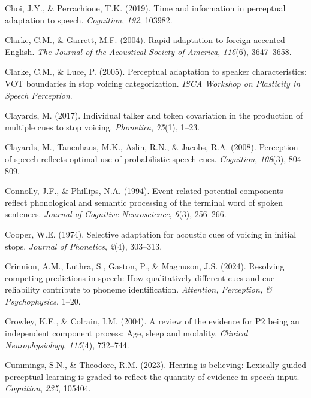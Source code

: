 \documentclass[
  12pt,
  twoside]{article}
\newlength{\cslhangindent}
\newlength{\cslentryspacingunit} %
\newenvironment{CSLReferences}[2] %
 {%
  \setlength{\parindent}{0pt}
  \ifodd #1
  \let\oldpar\par
  \def\par{\hangindent=\cslhangindent\oldpar}
  \fi
  \setlength{\parskip}{#2\cslentryspacingunit}
 }%
 {}
\begin{document}
\begin{CSLReferences}{1}{0}
\leavevmode{}%
Choi, J.Y., \& Perrachione, T.K. (2019). Time and information in perceptual adaptation to speech. \emph{Cognition}, \emph{192}, 103982.

\leavevmode{}%
Clarke, C.M., \& Garrett, M.F. (2004). Rapid adaptation to foreign-accented {English}. \emph{The Journal of the Acoustical Society of America}, \emph{116}(6), 3647--3658.

\leavevmode{}%
Clarke, C.M., \& Luce, P. (2005). Perceptual adaptation to speaker characteristics: {VOT} boundaries in stop voicing categorization. \emph{ISCA Workshop on Plasticity in Speech Perception}.

\leavevmode{}%
Clayards, M. (2017). Individual talker and token covariation in the production of multiple cues to stop voicing. \emph{Phonetica}, \emph{75}(1), 1--23.

\leavevmode{}%
Clayards, M., Tanenhaus, M.K., Aslin, R.N., \& Jacobs, R.A. (2008). Perception of speech reflects optimal use of probabilistic speech cues. \emph{Cognition}, \emph{108}(3), 804--809.

\leavevmode{}%
Connolly, J.F., \& Phillips, N.A. (1994). Event-related potential components reflect phonological and semantic processing of the terminal word of spoken sentences. \emph{Journal of Cognitive Neuroscience}, \emph{6}(3), 256--266.

\leavevmode{}%
Cooper, W.E. (1974). Selective adaptation for acoustic cues of voicing in initial stops. \emph{Journal of Phonetics}, \emph{2}(4), 303--313.

\leavevmode{}%
Crinnion, A.M., Luthra, S., Gaston, P., \& Magnuson, J.S. (2024). Resolving competing predictions in speech: How qualitatively different cues and cue reliability contribute to phoneme identification. \emph{Attention, Perception, \& Psychophysics}, 1--20.

\leavevmode{}%
Crowley, K.E., \& Colrain, I.M. (2004). A review of the evidence for {P2} being an independent component process: Age, sleep and modality. \emph{Clinical Neurophysiology}, \emph{115}(4), 732--744.

\leavevmode{}%
Cummings, S.N., \& Theodore, R.M. (2023). Hearing is believing: Lexically guided perceptual learning is graded to reflect the quantity of evidence in speech input. \emph{Cognition}, \emph{235}, 105404.


\end{CSLReferences}
\end{document}
